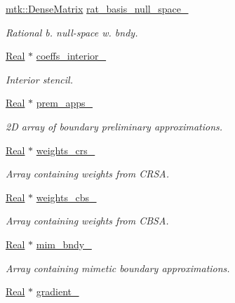 \begin{DoxyCompactItemize}
\hyperlink{classmtk_1_1DenseMatrix}{mtk\-::\-Dense\-Matrix} \hyperlink{classmtk_1_1Grad1D_adf93314923eb672af8056789170fe683}{rat\-\_\-basis\-\_\-null\-\_\-space\-\_\-}
\begin{DoxyCompactList}\small\item\em Rational b. null-\/space w. bndy. \end{DoxyCompactList}\item 
\hyperlink{group__c01-roots_gac080bbbf5cbb5502c9f00405f894857d}{Real} $\ast$ \hyperlink{classmtk_1_1Grad1D_a2395861161c26f237e892aacebcc1909}{coeffs\-\_\-interior\-\_\-}
\begin{DoxyCompactList}\small\item\em Interior stencil. \end{DoxyCompactList}\item 
\hyperlink{group__c01-roots_gac080bbbf5cbb5502c9f00405f894857d}{Real} $\ast$ \hyperlink{classmtk_1_1Grad1D_aee092221dd2a496e0d51883168035551}{prem\-\_\-apps\-\_\-}
\begin{DoxyCompactList}\small\item\em 2\-D array of boundary preliminary approximations. \end{DoxyCompactList}\item 
\hyperlink{group__c01-roots_gac080bbbf5cbb5502c9f00405f894857d}{Real} $\ast$ \hyperlink{classmtk_1_1Grad1D_a96914abea78528b32499963ce9bbe4a6}{weights\-\_\-crs\-\_\-}
\begin{DoxyCompactList}\small\item\em Array containing weights from C\-R\-S\-A. \end{DoxyCompactList}\item 
\hyperlink{group__c01-roots_gac080bbbf5cbb5502c9f00405f894857d}{Real} $\ast$ \hyperlink{classmtk_1_1Grad1D_ae6b0a908748923b2acd97e5bf7acc000}{weights\-\_\-cbs\-\_\-}
\begin{DoxyCompactList}\small\item\em Array containing weights from C\-B\-S\-A. \end{DoxyCompactList}\item 
\hyperlink{group__c01-roots_gac080bbbf5cbb5502c9f00405f894857d}{Real} $\ast$ \hyperlink{classmtk_1_1Grad1D_afcd61d362ba7b0f588645ab09c773432}{mim\-\_\-bndy\-\_\-}
\begin{DoxyCompactList}\small\item\em Array containing mimetic boundary approximations. \end{DoxyCompactList}\item 
\hyperlink{group__c01-roots_gac080bbbf5cbb5502c9f00405f894857d}{Real} $\ast$ \hyperlink{classmtk_1_1Grad1D_a024b84b1ea285c0c590eb42d40ff4469}{gradient\-\_\-}

\end{DoxyCompactItemize}
